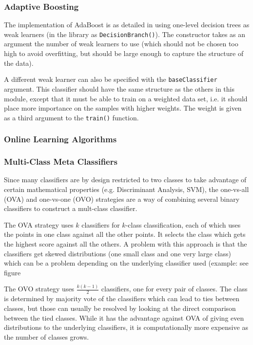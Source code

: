 \documentclass[a4paper]{article}
\begin{document}
\subsubsection{Adaptive Boosting} %
The implementation of AdaBoost is as detailed in \cite{PRML} using one-level decision trees as weak learners (in the library as \texttt{DecisionBranch()}). The constructor takes as an argument the number of weak learners to use (which should not be chosen too high to avoid overfitting, but should be large enough to capture the structure of the data).

A different weak learner can also be specified with the \texttt{baseClassifier} argument. This classifier should have the same structure as the others in this module, except that it must be able to train on a weighted data set, i.e. it should place more importance on the samples with higher weights. The weight is given as a third argument to the \texttt{train()} function.

\subsubsection{Online Learning Algorithms}

\subsubsection{Multi-Class Meta Classifiers}
Since many classifiers are by design restricted to two classes to take advantage of certain mathematical properties (e.g. Discriminant Analysis, SVM), the one-vs-all (OVA) and one-vs-one (OVO) strategies are a way of combining several binary classifiers to construct a mult-class classifier.

The OVA strategy uses $k$ classifiers for $k$-class classification, each of which uses the points in one class against all the other points. It selects the class which gets the highest score against all the others. A problem with this approach is that the classifiers get skewed distributions (one small class and one very large class) which can be a problem depending on the underlying classifier used (example: see figure %

The OVO strategy uses $\frac{k(k-1)}{2}$ classifiers, one for every pair of classes. The class is determined by majority vote of the classifiers which can lead to ties between classes, but those can usually be resolved by looking at the direct comparison between the tied classes. While it has the advantage against OVA of giving even distributions to the underlying classifiers, it is computationally more expensive as the number of classes grows.
\end{document}
